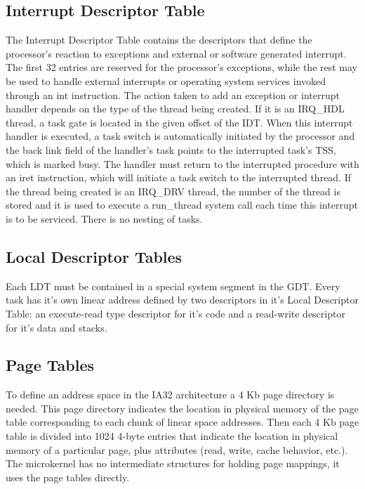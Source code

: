 \documentclass[11pt, letterpaper, twoside, english]{book}
\begin{document}
\subsection{Interrupt Descriptor Table}

The Interrupt Descriptor Table contains the descriptors that define the processor's reaction to exceptions and external or software generated interrupt. The first 32 entries are reserved for the processor's exceptions, while the rest may be used to handle external interrupts or operating system services invoked through an \textsf{int} instruction. The action taken to add an exception or interrupt handler depends on the type of the thread being created. If it is an \textsf{IRQ\_HDL} thread, a task gate is located in the given offset of the IDT. When this interrupt handler is executed, a task switch is automatically initiated by the processor and the back link field of the handler's task points to the interrupted task's TSS, which is marked busy. The handler must return to the interrupted procedure with an \textsf{iret} instruction, which will initiate a task switch to the interrupted thread. If the thread being created is an \textsf{IRQ\_DRV} thread, the number of the thread is stored and it is used to execute a \textsf{run\_thread} system call each time this interrupt is to be serviced. There is no nesting of tasks.

\subsection{Local Descriptor Tables}

Each LDT must be contained in a special system segment in the GDT. Every task has it's own linear address defined by two descriptors in it's Local Descriptor Table: an execute-read type descriptor for it's code and a read-write descriptor for it's data and stacks.

\subsection{Page Tables}

To define an address space in the IA32 architecture a 4 Kb page directory is needed. This page directory indicates the location in physical memory of the page table corresponding to each chunk of linear space addresses. Then each 4 Kb page table is divided into 1024 4-byte entries that indicate the location in physical memory of a particular page, plus attributes (read, write, cache behavior, etc.). The microkernel has no intermediate structures for holding page mappings, it uses the page tables directly.
\end{document}
